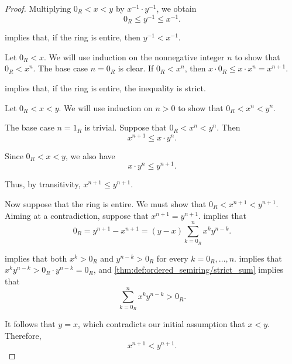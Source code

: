 \begin{proof}
   Multiplying \( 0_R < x < y \) by \( x^{-1} \cdot y^{-1} \), we obtain
  \begin{equation*}
    0_R \leq y^{-1} \leq x^{-1}.
  \end{equation*}

   implies that, if the ring is entire, then \( y^{-1} < x^{-1} \).

   Let \( 0_R < x \). We will use induction on the nonnegative integer \( n \) to show that \( 0_R < x^n \). The base case \( n = 0_R \) is clear. If \( 0_R < x^n \), then \( x \cdot 0_R \leq x \cdot x^n = x^{n+1} \).

   implies that, if the ring is entire, the inequality is strict.

   Let \( 0_R < x < y \). We will use induction on \( n > 0 \) to show that \( 0_R < x^n < y^n \).

  The base case \( n = 1_R \) is trivial. Suppose that \( 0_R < x^n < y^n \). Then
  \begin{equation*}
    x^{n+1} \leq x \cdot y^n.
  \end{equation*}

  Since \( 0_R < x < y \), we also have
  \begin{equation*}
    x \cdot y^n \leq y^{n+1}.
  \end{equation*}

  Thus, by transitivity, \( x^{n+1} \leq y^{n+1} \).

  Now suppose that the ring is entire. We must show that \( 0_R < x^{n+1} < y^{n+1} \). Aiming at a contradiction, suppose that \( x^{n+1} = y^{n+1} \).  implies that
  \begin{equation*}
    0_R
    =
    y^{n+1} - x^{n+1}
    =
    (y - x) \sum_{k=0_R}^n x^k y^{n-k}.
  \end{equation*}

   implies that both \( x^k > 0_R \) and \( y^{n-k} > 0_R \) for every \( k = 0_R, \ldots, n \).  implies that \( x^k y^{n-k} > 0_R \cdot y^{n-k} = 0_R \), and \cref{thm:def:ordered_semiring/strict_sum} implies that
  \begin{equation*}
    \sum_{k=0_R}^n x^k y^{n-k} > 0_R.
  \end{equation*}

  It follows that \( y = x \), which contradicts our initial assumption that \( x < y \). Therefore,
  \begin{equation*}
    x^{n+1} < y^{n+1}.
  \end{equation*}
\end{proof}

